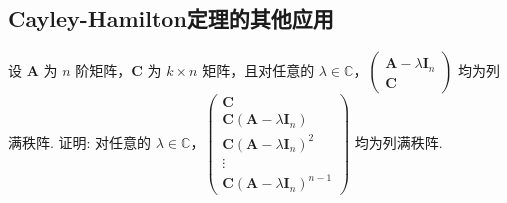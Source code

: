 \documentclass[../../main.tex]{subfiles}%
\begin{document}
\subsection{Cayley-Hamilton定理的其他应用}

\begin{example}
设 $\boldsymbol{A}$ 为 $n$ 阶矩阵，$\boldsymbol{C}$ 为 $k\times n$ 矩阵，且对任意的 $\lambda\in\mathbb{C}$，$\begin{pmatrix}
\boldsymbol{A}-\lambda\boldsymbol{I}_n \\
\boldsymbol{C}
\end{pmatrix}$ 均为列满秩阵. 证明: 对任意的 $\lambda\in\mathbb{C}$，$\begin{pmatrix}
\boldsymbol{C} \\
\boldsymbol{C}(\boldsymbol{A}-\lambda\boldsymbol{I}_n) \\
\boldsymbol{C}(\boldsymbol{A}-\lambda\boldsymbol{I}_n)^2 \\
\vdots \\
\boldsymbol{C}(\boldsymbol{A}-\lambda\boldsymbol{I}_n)^{n - 1}
\end{pmatrix}$ 均为列满秩阵.
\end{example}
\end{document}
